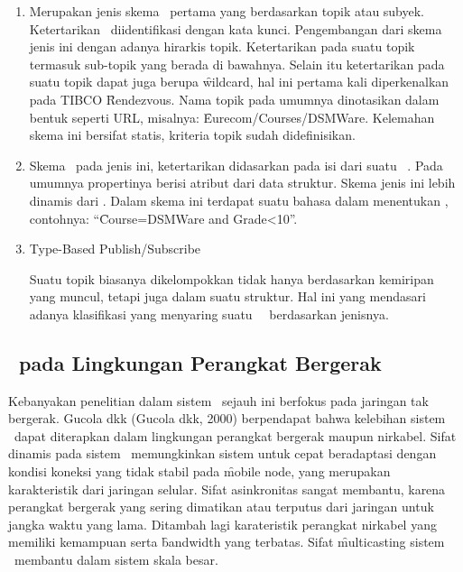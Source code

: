 \begin{enumerate}[noitemsep,nolistsep,leftmargin=0cm,itemindent=.5cm,listparindent=\parindent]
    \item \TopicBased

        Merupakan jenis skema \pubsub~pertama
        yang berdasarkan topik atau subyek. Ketertarikan \subscriber~diidentifikasi
        dengan kata kunci. Pengembangan dari skema jenis ini dengan adanya hirarkis
        topik. Ketertarikan pada suatu topik termasuk sub-topik yang berada di bawahnya.
        Selain itu ketertarikan pada suatu topik dapat juga berupa \f{wildcard}, hal ini
        pertama kali diperkenalkan pada TIBCO \f{Rendezvous}. Nama topik pada umumnya
        dinotasikan dalam bentuk seperti URL, misalnya: \f{Eurecom/Courses/DSMWare}.
        Kelemahan skema ini bersifat statis, kriteria topik sudah didefinisikan.
    \item \ContentBased

        Skema \subscription~pada jenis ini, ketertarikan didasarkan pada isi dari
        suatu \event~\pubsub.
        Pada umumnya propertinya berisi atribut dari data struktur. Skema jenis ini
        lebih dinamis dari \topicbased. Dalam skema ini terdapat
        suatu bahasa dalam menentukan \subscription, contohnya: ``\f{Course=DSMWare and
        Grade\textless10}''.
    \item Type-Based Publish/Subscribe

        Suatu topik biasanya dikelompokkan tidak hanya berdasarkan kemiripan yang muncul,
        tetapi juga dalam suatu struktur. Hal ini yang mendasari adanya klasifikasi
        yang menyaring suatu \event~\pubsub~berdasarkan jenisnya.
\end{enumerate}

\subsection{\PubSub~pada Lingkungan Perangkat Bergerak}

Kebanyakan penelitian dalam sistem \pubsub~sejauh ini berfokus pada jaringan
tak bergerak. Gucola dkk (Gucola dkk, 2000) berpendapat bahwa kelebihan sistem
\pubsub~dapat diterapkan dalam lingkungan perangkat bergerak maupun nirkabel.
Sifat dinamis pada sistem \pubsub~memungkinkan sistem untuk cepat beradaptasi
dengan kondisi koneksi yang tidak stabil pada \f{mobile node}, yang merupakan
karakteristik dari jaringan selular. Sifat asinkronitas sangat membantu, karena
perangkat bergerak yang sering dimatikan atau terputus dari jaringan untuk
jangka waktu yang lama. Ditambah lagi karateristik perangkat nirkabel yang
memiliki kemampuan serta \f{bandwidth} yang terbatas. Sifat \f{multicasting}
sistem \pubsub~membantu dalam sistem skala besar.

